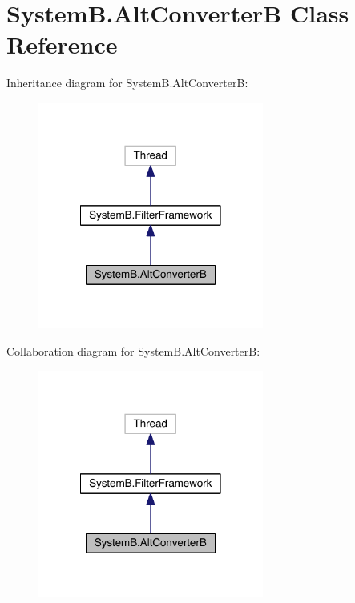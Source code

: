 \hypertarget{class_system_b_1_1_alt_converter_b}{}\section{System\+B.\+Alt\+Converter\+B Class Reference}
\label{class_system_b_1_1_alt_converter_b}


Inheritance diagram for System\+B.\+Alt\+Converter\+B\+:
\nopagebreak
\begin{figure}[H]
\begin{center}
\leavevmode
\includegraphics[width=210pt]{class_system_b_1_1_alt_converter_b__inherit__graph}
\end{center}
\end{figure}


Collaboration diagram for System\+B.\+Alt\+Converter\+B\+:
\nopagebreak
\begin{figure}[H]
\begin{center}
\leavevmode
\includegraphics[width=210pt]{class_system_b_1_1_alt_converter_b__coll__graph}
\end{center}
\end{figure}
